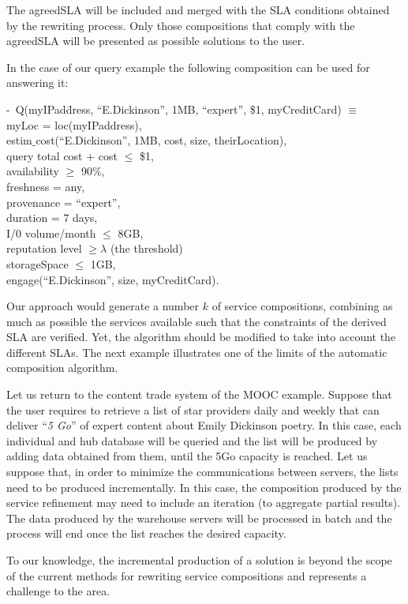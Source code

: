 The agreedSLA will be included and merged with the SLA conditions obtained by the rewriting process. Only those compositions that comply with the agreedSLA will be presented as possible solutions to the user.
\color{black}

In the case of our query example the following composition can be used for answering it:

\begin{footnotesize}
\sf
\begin{tabbing}
 -~Q(myIPad\=dress, ``E.Dickinson'', 1MB, ``expert'', \$1, myCreditCard) $\equiv$ \\
 \>  myLoc = loc(myIPaddress), \\
 \>  estim$\_$cost(``E.Dickinson'', 1MB, cost, size, theirLocation), \\
 \>  query total cost + cost $\leq$ \$1,\\
 \>  availability $\geq$ 90$\%$, \\
 \>  freshness = any, \\
 \>  provenance = ``expert'', \\
 \>  duration = 7 days, \\
 \>  I/0 volume/month $\leq$ 8GB, \\
 \>  reputation level $\geq \lambda$ (the threshold) \\
 \>  storageSpace $\leq$ 1GB, \\
 \>  engage(``E.Dickinson'', size, myCreditCard).
 \end{tabbing} 
\end{footnotesize}

Our approach would generate a number $k$ of service compositions, combining as much as possible the services available such that the constraints of the derived SLA are verified. 
 Yet, the algorithm should be modified to take into account the different SLAs. The next example illustrates one of the limits of the automatic composition algorithm.

\color{red}
\begin{example}\label{Ex:rew2}
Let us return to the content  trade system of the MOOC example.
 Suppose that the user requires to retrieve a list of star providers  daily and weekly that can deliver ``\textit{5 Go}'' of expert content about Emily Dickinson poetry.
In this case, each individual and hub database will be queried and the list will be produced by adding data obtained from them, until the 5Go  capacity is reached.
Let us suppose that, in order to minimize the  communications between servers, the lists need to be produced incrementally.
In this case, the composition produced by the service refinement may need to include an iteration (to aggregate partial results). 
The data produced by the warehouse servers will be processed in batch and the process will end once the list reaches the desired capacity.

To our knowledge, the incremental production of a solution is beyond  the scope of the current methods for rewriting service compositions and represents a challenge to the area.
~\hfill\openbox
\end{example}

